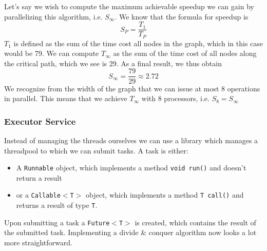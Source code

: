 \documentclass[main.tex]{subfiles}
\begin{document}
\begin{example}
\begin{center}
    \end{center}
    Let's say we wish to compute the maximum achievable speedup we can gain by parallelizing this algorithm, i.e. $S_\infty$. We know that the formula for speedup is
    \begin{equation*}
        S_P = \frac{T_1}{T_P}
    \end{equation*}
    $T_1$ is defined as the sum of the time cost all nodes in the graph, which in this case would be 79.  We can compute $T_\infty$ as the sum of the time cost of all nodes along the critical path, which we see is 29. As a final result, we thus obtain
    \begin{equation*}
        S_\infty = \frac{79}{29} \approx 2.72
    \end{equation*}
    We recognize from the width of the graph that we can issue at most 8 operations in parallel. This means that we achieve $T_\infty$ with 8 processors, i.e. $S_8 = S_\infty$
\end{example}


\subsubsection{Executor Service} \label{Executor Service}
Instead of managing the threads ourselves we can use a library which manages a threadpool to which we can submit tasks. A task is either:
\begin{itemize}
    \item A \texttt{Runnable} object, which implements a method \texttt{void run()} and doesn't return a result
    \item or a \texttt{Callable$<$T$>$} object, which implements a method \texttt{T call()} and returns a result of type \texttt{T}.
\end{itemize}
Upon submitting a task a \texttt{Future$<$T$>$} is created, which contains the result of the submitted task. Implementing a divide \& conquer algorithm now looks a lot more straightforward.

\newpage
\end{document}
